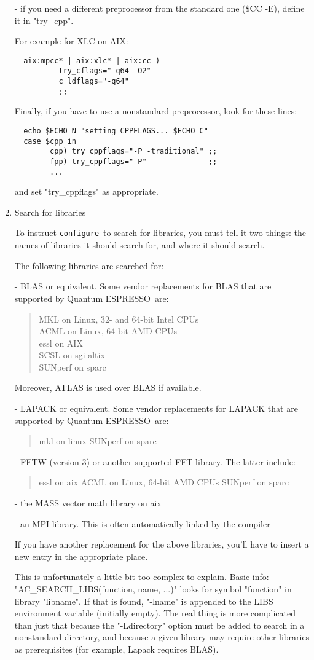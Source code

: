 \documentclass[12pt,a4paper]{article}
\def\qe{{\sc Quantum ESPRESSO}}
\def\configure{\texttt{configure}}
\begin{document}
\begin{enumerate}
- if you need a different preprocessor from the standard one (\$CC -E),
define it in "try\_cpp".

For example for XLC on AIX:
\begin{verbatim}
  aix:mpcc* | aix:xlc* | aix:cc )
          try_cflags="-q64 -O2"
          c_ldflags="-q64"
          ;;
\end{verbatim}
Finally, if you have to use a nonstandard preprocessor, look for these
lines:
\begin{verbatim}
  echo $ECHO_N "setting CPPFLAGS... $ECHO_C"
  case $cpp in
        cpp) try_cppflags="-P -traditional" ;;
        fpp) try_cppflags="-P"              ;;
        ...
\end{verbatim}
and set "try\_cppflags" as appropriate.

\item Search for libraries

To instruct \configure\ to search for libraries, you must tell it two
things: the names of libraries it should search for, and where it
should search.

The following libraries are searched for:

- BLAS or equivalent. 
Some vendor replacements for BLAS that are supported by \qe\ are:
\begin{quote}
    MKL on Linux, 32- and 64-bit Intel CPUs\\
    ACML on Linux, 64-bit AMD CPUs\\
    essl on AIX\\
    SCSL on sgi altix\\
    SUNperf on sparc
\end{quote}
Moreover, ATLAS is used over BLAS if available.

- LAPACK or equivalent. Some vendor replacements for LAPACK that are supported by \qe\ are:
\begin{quote}
    mkl on linux
    SUNperf on sparc
\end{quote}

- FFTW (version 3) or another supported FFT library. The latter include:
\begin{quote}
    essl on aix
    ACML on Linux, 64-bit AMD CPUs
    SUNperf on sparc
\end{quote}

- the MASS vector math library on aix

- an MPI library. This is often automatically linked by the compiler

If you have another replacement for the above libraries, you'll have
to insert a new entry in the appropriate place.

This is unfortunately a little bit too complex to explain.
Basic info: "AC\_SEARCH\_LIBS(function, name, ...)" looks for symbol
"function" in library "libname".  If that is found, "-lname" is
appended to the LIBS environment variable (initially empty).
The real thing is more complicated than just that because the
"-Ldirectory" option must be added to search in a nonstandard
directory, and because a given library may require other libraries as
prerequisites (for example, Lapack requires BLAS).
\end{enumerate}
\end{document}
